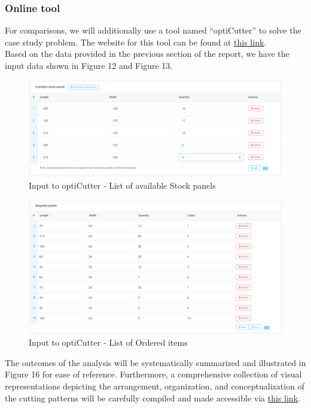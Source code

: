 \documentclass[a4paper]{article}
\begin{document}
    \subsubsection{Online tool}
    For comparisons, we will additionally use a tool named ``optiCutter'' to solve the case study problem. The website for this tool can be found at \href{https://www.opticutter.com/}{this link}.
    \vspace{0.2cm}\\
    Based on the data provided in the previous section of the report, we have the input data shown in Figure 12 and Figure 13.

    \begin{figure}[h]
        \centering
        \includegraphics[scale = 0.35]{Image/stock.png}
        \caption{Input to optiCutter - List of available Stock panels}
    \end{figure}    

    \begin{figure}[h]
        \centering
        \includegraphics[scale = 0.35]{Image/item.png}
        \caption{Input to optiCutter - List of Ordered items}
    \end{figure}
    
    \pagebreak
    \noindent
    The outcomes of the analysis will be systematically summarized and illustrated in Figure 16 for ease of reference. Furthermore, a comprehensive collection of visual representations depicting the arrangement, organization, and conceptualization of the cutting patterns will be carefully compiled and made accessible via \href{https://drive.google.com/drive/folders/1_dRKWVKkN0s9JnjSz-RYTw6IpdhNV-eQ?usp=sharing}{this link}.
\end{document}
